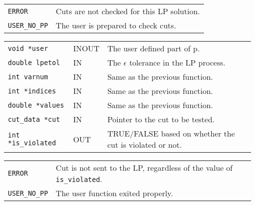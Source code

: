 \documentclass[twoside,11pt]{article}
\begin{document}
{\newpage
\clearpage
\samepage \begin{tabular}{lp{365.945pt}}
{\tt ERROR} & Cuts are not checked for this LP solution. \\ 
{\tt USER\_NO\_PP} & The user is prepared to check cuts. \\ 
\end{tabular}
}

{\newpage
\clearpage
\samepage \begin{tabular}{llp{292.615pt}}
{\tt void *user} & INOUT & The user defined part of p. \\ 
{\tt double lpetol} & IN & The $\epsilon$ tolerance in the LP process. \\ 
{\tt int varnum} & IN & Same as the previous function. \\ 
{\tt int *indices} & IN & Same as the previous function. \\ 
{\tt double *values} & IN & Same as the previous function. \\ 
{\tt cut\_data *cut} & IN & Pointer to the cut to be tested. \\ 
{\tt int *is\_violated} & OUT & TRUE/FALSE based on whether the cut is violated
or not. \\ 
\end{tabular}
}

{\newpage
\clearpage
\samepage \begin{tabular}{lp{365.945pt}}
{\tt ERROR} & Cut is not sent to the LP, regardless of the value of
{\tt *is\_violated}. \\ 
{\tt USER\_NO\_PP} & The user function exited properly. \\ 
\end{tabular}
}

\end{document}
